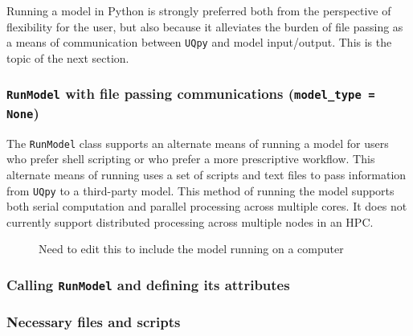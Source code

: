 Running a model in Python is strongly preferred both from the perspective of flexibility for the user, but also because it alleviates the burden of file passing as a means of communication between \texttt{UQpy} and model input/output. This is the topic of the next section.

\subsubsection{\texttt{RunModel} with file passing communications (\texttt{model\_type = None})}
The \texttt{RunModel} class supports an alternate means of running a model for users who prefer shell scripting or who prefer a more prescriptive workflow. This alternate means of running uses a set of scripts and text files to pass information from \texttt{UQpy} to a third-party model. This method of running the model supports both serial computation and parallel processing across multiple cores. It does not currently support distributed processing across multiple nodes in an HPC. 

\begin{figure}[!ht]
	\caption{}
	\label{template_model}
\end{figure}

\begin{figure}[!ht]
	\caption{}
	\label{template_model}
\end{figure}


\begin{figure}[!ht]
	\caption{Need to edit this to include the model running on a computer}
	\label{template_model}
\end{figure}

\begin{figure}[!ht]
	\caption{}
	\label{template_model}
\end{figure}

\subsubsection{Calling \texttt{RunModel} and defining its attributes}
\label{sec:RM_attributes}

\subsubsection{Necessary files and scripts}

